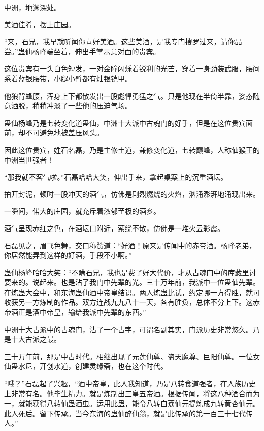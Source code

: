 
\begin{this_body}



中洲，地渊深处。

美酒佳肴，摆上庄园。

“来，石兄，我早就听闻你喜好美酒。这些美酒，是我专门搜罗过来，请你品尝。”蛊仙杨峰端坐着，伸出手掌示意对面的贵宾。

这位贵宾有一头白色短发，一对金瞳闪烁着锐利的光芒，穿着一身劲装武服，腰间系着蓝银腰带，小腿小臂都有灿银铠甲。

他狼背蜂腰，浑身上下都散发出一股彪悍勇猛之气。只是他现在半倚半靠，姿态随意洒脱，稍稍冲淡了一些他的压迫气场。

蛊仙杨峰乃是七转变化道蛊仙，中洲十大派中古魂门的好手，但是在这位贵宾面前，却不可避免地被盖压风头。

因此这位贵宾，姓石名磊，乃是主修土道，兼修变化道，七转巅峰，人称仙猴王的中洲当世强者！

“那我就不客气啦。”石磊哈哈大笑，伸出手来，拿起桌案上的沉重酒坛。

拍开封泥，顿时一股冲天的酒气，仿佛是剧烈燃烧的火焰，汹涌澎湃地涌现出来。

一瞬间，偌大的庄园，就充斥着浓郁至极的酒乡。

酒气呈现赤红之色，在酒坛口附近，萦绕不散，仿佛是一堆火云彩霞。

石磊见之，眉飞色舞，交口称赞道：“好酒！原来是传闻中的赤帝酒。杨峰老弟，你居然能弄到这样的好酒，手段不小啊。”

蛊仙杨峰哈哈大笑：“不瞒石兄，我也是费了好大代价，才从古魂门中的库藏里讨要来的。说起来。也是沾了我门中先辈的光。三十万年前，我派中一位蛊仙先辈。在炼蛊大会中，和东海蛊仙酒中帝皇结识。两人炼蛊比试，约定哪一方得胜，就可收获另一方炼制的作品。双方连战九九八十一天，各有胜负，总体不分上下。这赤帝酒正是酒中帝皇，输给我派中先辈的东西。”

中洲十大古派中的古魂门，沾了一个古字，可谓名副其实，门派历史非常悠久。乃是十大古派之最。

三十万年前，那是中古时代。相继出现了元莲仙尊、盗天魔尊、巨阳仙尊。一位女仙蛊水尼，开创水道，创建灵缘斋，也在这个时代。

“哦？”石磊起了兴趣，“酒中帝皇，此人我知道，乃是八转食道强者，在人族历史上非常有名。他毕生精力。就是炼制出三皇五帝酒。根据传闻，将这八种酒合而为一，就能获得八转仙蛊酒虫。运用此蛊，能令八转白荔仙元提炼成九转黄杏仙元。此人死后。留下传承。当今东海的蛊仙醉仙翁，就是此传承的第一百三十七代传人。”


\end{this_body}
